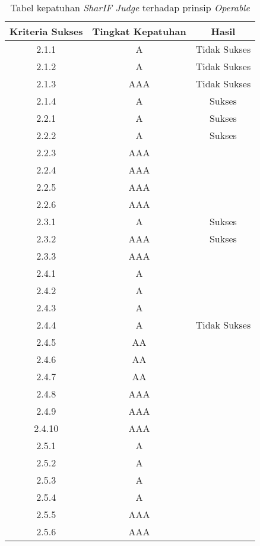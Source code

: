 \begin{table}[H]
	\centering
	\caption{Tabel kepatuhan \textit{SharIF Judge} terhadap prinsip \textit{Operable}}
	\label{tab:kepatuhan_sharif_judge_operable}
	\begin{tabular}{|c|c|c|}
		\hline
		Kriteria Sukses & Tingkat Kepatuhan & Hasil \\
		\hline
		2.1.1 & A & Tidak Sukses \\
		2.1.2 & A & Tidak Sukses \\
		2.1.3 & AAA & Tidak Sukses \\
		2.1.4 & A & Sukses \\
		2.2.1 & A & Sukses \\
		2.2.2 & A & Sukses \\
		2.2.3 & AAA & \\
		2.2.4 & AAA & \\
		2.2.5 & AAA & \\
		2.2.6 & AAA & \\
		2.3.1 & A & Sukses\\
		2.3.2 & AAA & Sukses\\
		2.3.3 & AAA & \\
		2.4.1 & A & \\
		2.4.2 & A & \\
		2.4.3 & A & \\
		2.4.4 & A & Tidak Sukses \\
		2.4.5 & AA & \\
		2.4.6 & AA & \\
		2.4.7 & AA & \\
		2.4.8 & AAA & \\
		2.4.9 & AAA & \\
		2.4.10 & AAA & \\
		2.5.1 & A & \\
		2.5.2 & A & \\
		2.5.3 & A & \\
		2.5.4 & A & \\
		2.5.5 & AAA & \\
		2.5.6 & AAA & \\
		\hline
	\end{tabular}
\end{table}

